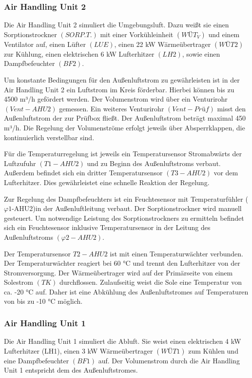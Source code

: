 \subsubsection{Air Handling Unit 2}
\label{Air Handling Unit 2}

Die Air Handling Unit 2 simuliert die Umgebungsluft. Dazu weißt sie einen Sorptionstrockner $(SORP.T.)$ mit einer Vorkühleinheit $(WÜT_{V})$ und einem Ventilator auf, einen Lüfter $(LUE)$, einen 22 kW Wärmeübertrager $(WÜT2)$ zur Kühlung, einen elektrischen 6 kW Lufterhitzer $(LH2)$, sowie einen Dampfbefeuchter $(BF2)$. 

Um konstante Bedingungen für den Außenluftstrom zu gewährleisten ist in der Air Handling Unit 2 ein Luftstrom im Kreis förderbar. Hierbei können bis zu 4500 m³/h gefördert werden. 
Der Volumenstrom wird über ein Venturirohr $(Vent-AHU2)$ gemessen. Ein weiteres Venturirohr $(Vent-Prüf)$ misst den Außenluftstrom der zur Prüfbox fließt. Der Außenluftstrom beträgt maximal 450 m³/h. Die Regelung der Volumenströme erfolgt jeweils über Absperrklappen, die kontinuierlich verstellbar sind. 

Für die Temperaturregelung ist jeweils ein Temperatursensor Stromabwärts der Luftzufuhr $(T1-AHU2)$ und zu Beginn des Außenluftstroms verbaut. Außerdem befindet sich ein dritter Temperatursensor $(T3-AHU2)$ vor dem Lufterhitzer. Dies gewährleistet eine schnelle Reaktion der Regelung.

Zur Regelung des Dampfbefeuchters ist ein Feuchtesensor mit Temperaturfühler ($\varphi1$-AHU2)in der Außenluftleitung verbaut. Der Sorptionstrockner wird manuell gesteuert. Um notwendige Leistung des Sorptionstrockners zu ermitteln befindet sich ein Feuchtesensor inklusive Temperatursensor in der Leitung des Außenluftstroms $(\varphi2-AHU2)$.

Der Temperatursensor $T2-AHU2$ ist mit einen Temperaturwächter verbunden. Der Temperaturwächter reagiert bei 60 °C und trennt den Lufterhitzer von der Stromversorgung.
Der Wärmeübertrager wird auf der Primärseite von einem Solestrom $(TK)$ durchflossen. Zulaufseitig weist die Sole eine Temperatur von ca. -20 °C auf. Daher ist eine Abkühlung des Außenluftstromes auf Temperaturen von bis zu -10 °C möglich. 


\subsubsection{Air Handling Unit 1}
\label{Air Handling Unit 1}
 
Die Air Handling Unit 1 simuliert die Abluft. Sie weist einen elektrischen 4 kW Lufterhitzer (LH1), einen 3 kW Wärmeübertrager $(WÜT1)$ zum Kühlen und eine Dampfbefeuchter $(BF1)$ auf. Der Volumenstrom durch die Air Handling Unit 1 entspricht dem des Außenluftstromes. 

